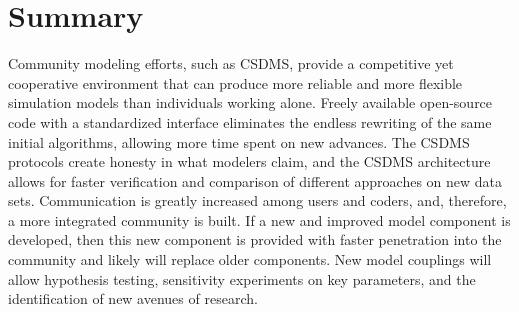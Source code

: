 \documentclass[10pt,twocolumn,preprint]{elsarticle}
\begin{document}
\section{Summary}

Community modeling efforts, such as CSDMS, provide a competitive yet cooperative environment that can produce more reliable and more flexible simulation models than individuals working alone. Freely available open-source code with a standardized interface eliminates the endless rewriting of the same initial algorithms, allowing more time spent on new advances. The CSDMS protocols create honesty in what modelers claim, and the CSDMS architecture allows for faster verification and comparison of different approaches on new data sets. Communication is greatly increased among users and coders, and, therefore, a more integrated community is built. If a new and improved model component is developed, then this new component is provided with faster penetration into the community and likely will replace older components. New model couplings will allow hypothesis testing, sensitivity experiments on key parameters, and the identification of new avenues of research.




\end{document}
